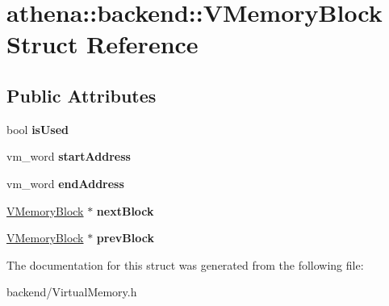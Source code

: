 \hypertarget{structathena_1_1backend_1_1_v_memory_block}{}\section{athena\+:\+:backend\+:\+:V\+Memory\+Block Struct Reference}
\label{structathena_1_1backend_1_1_v_memory_block}
\subsection*{Public Attributes}
\begin{DoxyCompactItemize}
\item 
\mbox{\label{structathena_1_1backend_1_1_v_memory_block_a54350a136efca373277b4d91a09c15cf}} 
bool {\bfseries is\+Used}
\item 
\mbox{\label{structathena_1_1backend_1_1_v_memory_block_ae7999c6fd515f8150185b23a52e410a8}} 
vm\+\_\+word {\bfseries start\+Address}
\item 
\mbox{\label{structathena_1_1backend_1_1_v_memory_block_a2585be4f90d28d5d0838934f3569ea00}} 
vm\+\_\+word {\bfseries end\+Address}
\item 
\mbox{\label{structathena_1_1backend_1_1_v_memory_block_a2bf211c6220136d1f9d38c86043ae2c6}} 
\mbox{\hyperlink{structathena_1_1backend_1_1_v_memory_block}{V\+Memory\+Block}} $\ast$ {\bfseries next\+Block}
\item 
\mbox{\label{structathena_1_1backend_1_1_v_memory_block_a9827bc62cfcb085a80d236311b7e1e2c}} 
\mbox{\hyperlink{structathena_1_1backend_1_1_v_memory_block}{V\+Memory\+Block}} $\ast$ {\bfseries prev\+Block}
\end{DoxyCompactItemize}


The documentation for this struct was generated from the following file\+:\begin{DoxyCompactItemize}
\item 
backend/Virtual\+Memory.\+h\end{DoxyCompactItemize}
